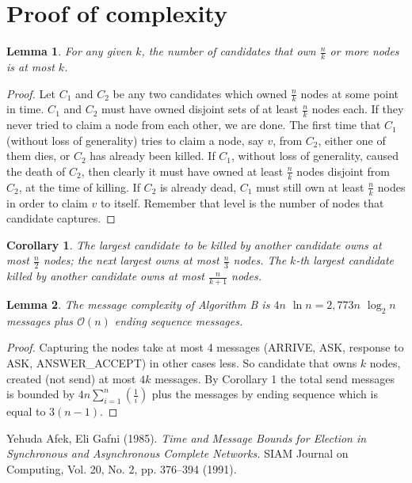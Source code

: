 \documentclass{article}
\newtheorem{lemma}{Lemma}
\newtheorem{corollary}[theorem]{Corollary}
\begin{document}
\section*{Proof of complexity}
\begin{lemma}
For any given \(k\), the number of candidates that own \(\frac{n}{k}\) or more nodes is at most \(k\). 
\end{lemma}
\begin{proof}
Let \(C_1\) and \(C_2\) be any two candidates which owned \(\frac{n}{k}\) nodes at some point in time. \(C_1\) and \(C_2\) must have owned disjoint sets of at least \(\frac{n}{k}\) nodes each. If they never tried to claim a node from each other, we are
done. The first time that \(C_1\) (without loss of generality) tries to claim a node, say \(v\),
from \(C_2\), either one of them dies, or \(C_2\) has already been killed. If \(C_1\), without loss
of generality, caused the death of \(C_2\), then clearly it must have owned at least \(\frac{n}{k}\)
nodes disjoint from \(C_2\), at the time of killing. If \(C_2\) is already dead, \(C_1\) must still own
at least \(\frac{n}{k}\) nodes in order to claim \(v\) to itself. Remember that level is the number of nodes that candidate captures.
\end{proof}
\begin{corollary}
The largest candidate to be killed by another candidate owns at most \(\frac{n}{2}\) nodes; the next largest owns at most \(\frac{n}{3}\) nodes. The \(k\)-th largest candidate killed by another candidate owns at most \(\frac{n}{k + 1}\) nodes.
\end{corollary}
\begin{lemma}
The message complexity of Algorithm B is \(4n\) \( \ln{n} = 2,773n\) \( \log_2{n}\) messages plus \(\mathcal{O}(n)\) ending sequence messages.
\end{lemma}
\begin{proof}
Capturing the nodes take at most 4 messages (ARRIVE, ASK, response to ASK, ANSWER\_ACCEPT) in other cases less. So candidate that owns \(k\) nodes, created (not send) at most \(4k\) messages. By Corollary 1 the total send messages is bounded by \(4n\sum_{i=1}^n(\frac{1}{i})\) plus the messages by ending sequence which is equal to \(3(n-1)\).
\end{proof}


\begin{thebibliography}{9}
Yehuda Afek, Eli Gafni (1985). \emph{Time and Message Bounds for Election in Synchronous and Asynchronous Complete Networks.} SIAM Journal on Computing, Vol. 20, No. 2, pp. 376–394 (1991).
\end{thebibliography}
\end{document}
